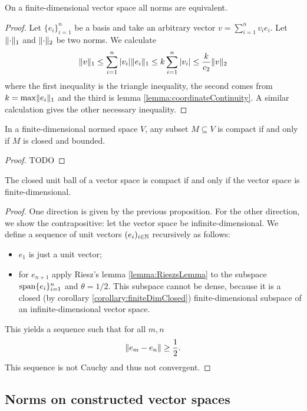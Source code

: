 \begin{proposition}
On a finite-dimensional vector space all norms are equivalent.
\end{proposition}
\begin{proof}
Let $\{e_i\}_{i=1}^n$ be a basis and take an arbitrary vector $v = \sum_{i=1}^nv_ie_i$. Let $\lVert\cdot\rVert_1$ and $\lVert\cdot\rVert_2$ be two norms.
We calculate
\[ \lVert v\rVert_1 \leq \sum_{i=1}^n|v_i|\lVert e_i\rVert_1 \leq k\sum_{i=1}^n|v_i| \leq \frac{k}{c_2}\lVert v\rVert_2 \]
where the first inequality is the triangle inequality, the second comes from $k=\max\lVert e_i\rVert_1$ and the third is lemma \ref{lemma:coordinateContinuity}. A similar calculation gives the other necessary inequality.
\end{proof}

\begin{proposition}
In a finite-dimensional normed space $V$, any subset $M \subseteq V$ is compact if and only if $M$ is closed and bounded.
\end{proposition}
\begin{proof}
TODO
\end{proof}

\begin{proposition}
The closed unit ball of a vector space is compact \textup{if and only if} the vector space is finite-dimensional.
\end{proposition}
\begin{proof}
One direction is given by the previous proposition. For the other direction, we show the contrapositive: let the vector space be infinite-dimensional.
We define a sequence of unit vectors $(e_i)_{i\in\mathbb{N}}$ recursively as follows:
\begin{itemize}
\item $e_1$ is just a unit vector;
\item for $e_{n+1}$ apply Riesz's lemma \ref{lemma:RieszsLemma} to the subspace $\operatorname{span}\{e_i\}_{i=1}^n$ and $\theta = 1/2$. This subspace cannot be dense, because it is a closed (by corollary \ref{corollary:finiteDimClosed}) finite-dimensional subspace of an infinite-dimensional vector space.
\end{itemize}
This yields a sequence such that for all $m,n$
\[ \lVert e_m - e_n\rVert\geq \frac{1}{2}. \]
This sequence is not Cauchy and thus not convergent.
\end{proof}







\subsection{Norms on constructed vector spaces}
